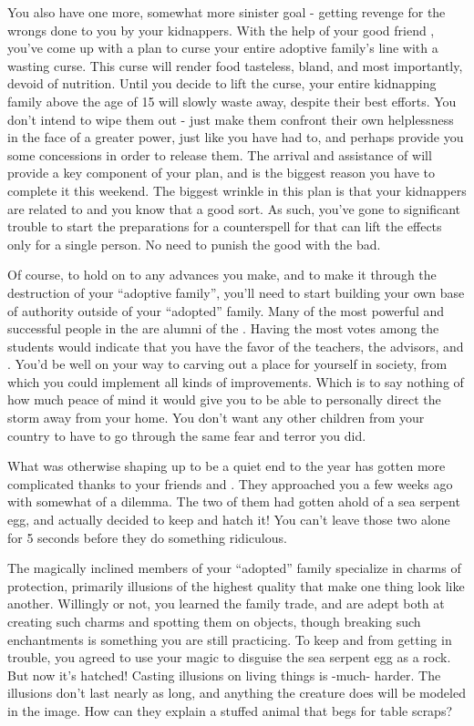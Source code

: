 \documentclass[char]{GL2020}
\begin{document}
You also have one more, somewhat more sinister goal - getting revenge for the wrongs done to you by your kidnappers.  With the help of your good friend \cLibAssist{}, you’ve come up with a plan to curse your entire adoptive family’s line with a wasting curse. This curse will render food tasteless, bland, and most importantly, devoid of nutrition. Until you decide to lift the curse, your entire kidnapping family above the age of 15 will slowly waste away, despite their best efforts. You don’t intend to wipe them out - just make them confront their own helplessness in the face of a greater power, just like you have had to, and perhaps provide you some concessions in order to release them. The arrival and assistance of \cCurse{} will provide a key component of your plan, and is the biggest reason you have to complete it this weekend.  The biggest wrinkle in this plan is that your kidnappers are related to \cMusic{} and you know that  a good sort. As such, you’ve gone to significant trouble to start the preparations for a counterspell for \cMusic{\them} that can lift the effects only for a single person. No need to punish the good with the bad.

Of course, to hold on to any advances you make, and to make it through the destruction of your ``adoptive family'', you'll need to start building your own base of authority outside of your ``adopted'' family. Many of the most powerful and successful people in the \pFarm{} are alumni of the \pSchool{}. Having the most votes among the \pFarmers{} students would indicate that you have the favor of the teachers, the advisors, and \cFarmGod{}. You'd be well on your way to carving out a place for yourself in \pFarm{} society, from which you could implement all kinds of improvements. Which is to say nothing of how much peace of mind it would give you to be able to personally direct the storm away from your home. You don't want any other children from your country to have to go through the same fear and terror you did.

What was otherwise shaping up to be a quiet end to the year has gotten more complicated thanks to your friends \cDisney{} and \cPirateChild{}. They approached you a few weeks ago with somewhat of a dilemma. The two of them had gotten ahold of a sea serpent egg, and actually decided to keep and hatch it! You can't leave those two alone for 5 seconds before they do something ridiculous. 

The magically inclined members of your ``adopted'' family specialize in charms of protection, primarily illusions of the highest quality that make one thing look like another. Willingly or not, you learned the family trade, and are adept both at creating such charms and spotting them on objects, though breaking such enchantments is something you are still practicing.  To keep \cDisney{} and \cPirateChild{} from getting in trouble, you agreed to use your magic to disguise the sea serpent egg as a rock. But now it's hatched!  Casting illusions on living things is -much- harder. The illusions don't last nearly as long, and anything the creature does will be modeled in the image. How can they explain a stuffed animal that begs for table scraps?
\end{document}
